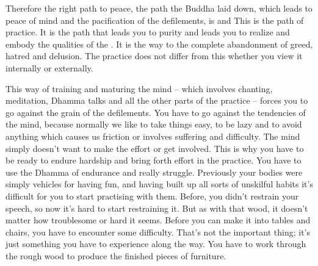 Therefore the right path to peace, the path the Buddha laid down, which leads to peace of mind and the pacification of the defilements, is   and  This is the path of practice. It is the path that leads you to purity and leads you to realize and embody the qualities of the . It is the way to the complete abandonment of greed, hatred and delusion. The practice does not differ from this whether you view it internally or externally.

This way of training and maturing the mind -- which involves chanting, meditation, Dhamma talks and all the other parts of the practice -- forces you to go against the grain of the defilements. You have to go against the tendencies of the mind, because normally we like to take things easy, to be lazy and to avoid anything which causes us friction or involves suffering and difficulty. The mind simply doesn't want to make the effort or get involved. This is why you have to be ready to endure hardship and bring forth effort in the practice. You have to use the Dhamma of endurance and really struggle. Previously your bodies were simply vehicles for having fun, and having built up all sorts of unskilful habits it's difficult for you to start practising with them. Before, you didn't restrain your speech, so now it's hard to start restraining it. But as with that wood, it doesn't matter how troublesome or hard it seems. Before you can make it into tables and chairs, you have to encounter some difficulty. That's not the important thing; it's just something you have to experience along the way. You have to work through the rough wood to produce the finished pieces of furniture.

